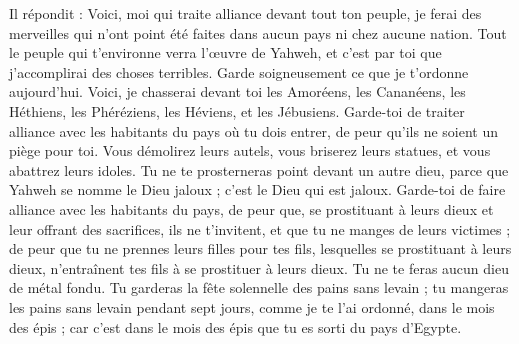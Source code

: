 \begin{multicols}{2}
Il répondit : Voici, moi qui traite alliance devant tout ton peuple, je ferai des merveilles qui n'ont point été faites dans aucun pays ni chez aucune nation. Tout le peuple qui t’environne verra l'œuvre de Yahweh, et c’est par toi que j’accomplirai des choses terribles.
Garde soigneusement ce que je t’ordonne aujourd'hui. Voici, je chasserai devant toi les Amoréens, les Cananéens, les Héthiens, les Phéréziens, les Héviens, et les Jébusiens.
Garde-toi de traiter alliance avec les habitants du pays où tu dois entrer, de peur qu’ils ne soient un piège pour toi.
Vous démolirez leurs autels, vous briserez leurs statues, et vous abattrez leurs idoles.
Tu ne te prosterneras point devant un autre dieu, parce que Yahweh se nomme le Dieu jaloux ; c'est le Dieu qui est jaloux.
Garde-toi de faire alliance avec les habitants du pays, de peur que, se prostituant à leurs dieux et leur offrant des sacrifices, ils ne t’invitent, et que tu ne manges de leurs victimes ;
de peur que tu ne prennes leurs filles pour tes fils, lesquelles se prostituant à leurs dieux, n’entraînent tes fils à se prostituer à leurs dieux.
Tu ne te feras aucun dieu de métal fondu.
Tu garderas la fête solennelle des pains sans levain ; tu mangeras les pains sans levain pendant sept jours, comme je te l'ai ordonné, dans le mois des épis ; car c’est dans le mois des épis que tu es sorti du pays d'Egypte.

\end{multicols}
